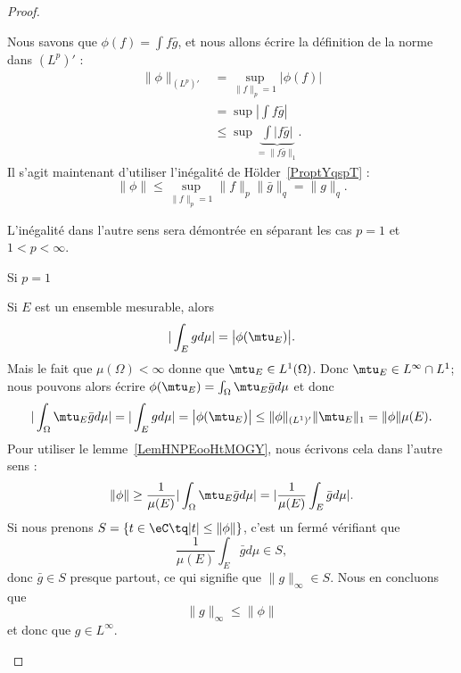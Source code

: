 \begin{proof}
\begin{subproof}
            Nous savons que \( \phi(f)=\int f\bar g\), et nous allons écrire la définition de la norme dans \( (L^p)'\) :
            \begin{subequations}
                \begin{align}
                    \| \phi \|_{(L^p)'}&=\sup_{\| f \|_p=1}\big| \phi(f) \big|\\
                    &=\sup| \int f\bar g |\\
                    &\leq\sup\underbrace{\int| f\bar g |}_{=\| f\bar g \|_1}.
                \end{align}
            \end{subequations}
            Il s'agit maintenant d'utiliser l'inégalité de Hölder~\ref{ProptYqspT} :
            \begin{equation}
                \| \phi \|\leq \sup_{\| f \|_p=1}\| f \|_p\| \bar g \|_q=\| g \|_q.
            \end{equation}

            L'inégalité dans l'autre sens sera démontrée en séparant les cas \( p=1\) et \( 1<p<\infty\).

        \item[Si \( p=1\)]

            Si \( E\) est un ensemble mesurable, alors
            \begin{equation}
                | \int_Egd\mu |=\big| \phi(\mtu_E) \big|.
            \end{equation}
            Mais le fait que \( \mu(\Omega)<\infty\) donne que \( \mtu_E\in L^1(\Omega)\). Donc \( \mtu_E\in L^{\infty}\cap L^1\); nous pouvons alors écrire \( \phi(\mtu_E)=\int_{\Omega}\mtu_E\bar gd\mu\) et donc
            \begin{equation}    \label{EqUPCTooJvoKKI}
                | \int_{\Omega}\mtu_E\bar gd\mu |=|\int_Egd\mu |=\big| \phi(\mtu_E) \big|\leq \| \phi \|_{(L^1)'}\| \mtu_E \|_1=\| \phi \|\mu(E).
            \end{equation}
            Pour utiliser le lemme~\ref{LemHNPEooHtMOGY}, nous écrivons cela dans l'autre sens :
            \begin{equation}
                \| \phi \|\geq \frac{1}{ \mu(E) }| \int_{\Omega}\mtu_E\bar gd\mu |=| \frac{1}{ \mu(E) }\int_E\bar gd\mu |.
            \end{equation}
            Si nous prenons \( S=\{ t\in \eC\tq | t |\leq \| \phi \| \}\), c'est un fermé vérifiant que
            \begin{equation}
                \frac{1}{ \mu(E) }\int_E\bar gd\mu\in S,
            \end{equation}
            donc \( \bar g\in S\) presque partout, ce qui signifie que \( \| g \|_{\infty}\in S\). Nous en concluons que
            \begin{equation}
                \| g \|_{\infty}\leq \| \phi \|
            \end{equation}
            et donc que \( g\in L^{\infty}\).


\end{subproof}
\end{proof}
